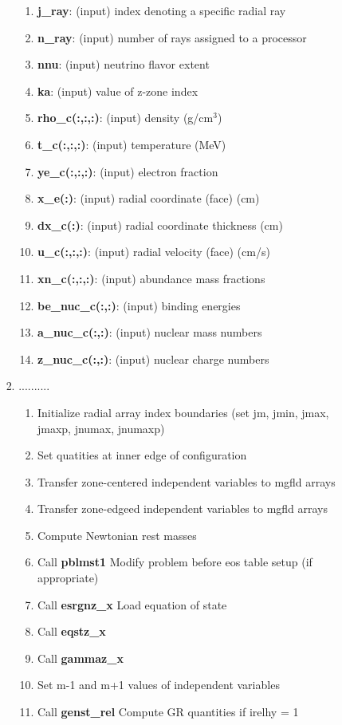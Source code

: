 \documentclass[11pt,doublespace]{article}
\begin{document}
\begin{itemize}
\begin{enumerate}
\begin{enumerate}
\begin{enumerate}
\begin{enumerate}
  \item {\bf j\_ray}: (input) index denoting a specific radial ray
  \item {\bf n\_ray}: (input) number of rays assigned to a processor
  \item {\bf nnu}: (input) neutrino flavor extent
  \item {\bf ka}: (input) value of z-zone index
  \item {\bf rho\_c(:,:,:)}: (input) density (g/cm$^{3}$)
  \item {\bf t\_c(:,:,:)}: (input) temperature (MeV)
  \item {\bf ye\_c(:,:,:)}: (input) electron fraction
  \item {\bf x\_e(:)}: (input) radial coordinate (face) (cm)
  \item {\bf dx\_c(:)}: (input) radial coordinate thickness (cm)
  \item {\bf u\_c(:,:,:)}: (input) radial velocity (face) (cm/s)
  \item {\bf xn\_c(:,:,:)}: (input) abundance mass fractions
  \item {\bf be\_nuc\_c(:,:)}: (input) binding energies
  \item {\bf a\_nuc\_c(:,:)}: (input) nuclear mass numbers
  \item {\bf z\_nuc\_c(:,:)}: (input) nuclear charge numbers
\end{enumerate}
  \item ..........
\begin{enumerate}
  \item Initialize radial array index boundaries (set jm, jmin, jmax, jmaxp, jnumax, jnumaxp)
  \item Set quatities at inner edge of configuration
  \item Transfer zone-centered independent variables to mgfld arrays
  \item Transfer zone-edgeed independent variables to mgfld arrays
  \item Compute Newtonian rest masses
  \item Call {\bf pblmst1} Modify problem before eos table setup (if appropriate)
  \item Call {\bf esrgnz\_x} Load equation of state
  \item Call {\bf eqstz\_x}
  \item Call {\bf gammaz\_x}
  \item Set m-1 and m+1 values of independent variables
  \item Call {\bf genst\_rel} Compute GR quantities if irelhy = 1

\end{enumerate}
\end{enumerate}
\end{enumerate}
\end{enumerate}
\end{itemize}
\end{document}
